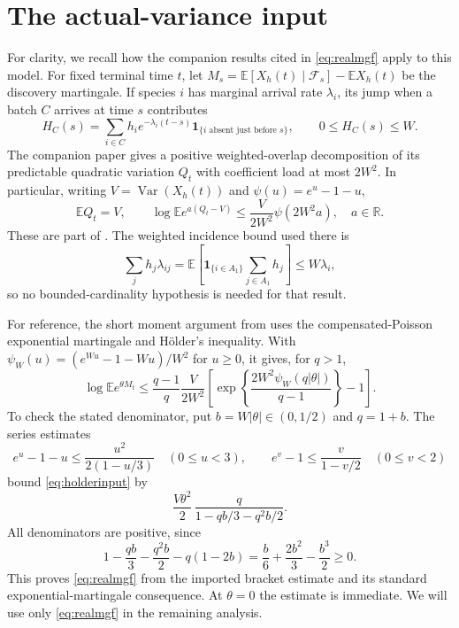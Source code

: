\documentclass[11pt]{article}
\numberwithin{equation}{section}
\theoremstyle{remark}
\newcommand{\E}{\mathbb E}
\newcommand{\R}{\mathbb R}
\newcommand{\ind}{\mathbf 1}
\newcommand{\Var}{\operatorname{Var}}
\begin{document}
\section{The actual-variance input}\label{sec:input}

For clarity, we recall how the companion results cited in
\eqref{eq:realmgf} apply to this model. For fixed terminal time $t$, let
$M_s=\E[X_h(t)\mid\mathcal F_s]-\E X_h(t)$ be the discovery martingale.
If species $i$ has marginal arrival rate $\lambda_i$, its jump when a batch
$C$ arrives at time $s$ contributes
\[
 H_C(s)=\sum_{i\in C}h_i e^{-\lambda_i(t-s)}
                    \ind_{\{i\text{ absent just before }s\}},
 \qquad 0\le H_C(s)\le W.
\]
The companion paper gives a positive weighted-overlap decomposition of its
predictable quadratic variation $Q_t$ with coefficient load at most $2W^2$.
In particular, writing $V=\Var(X_h(t))$ and $\psi(u)=e^u-1-u$,
\begin{equation}\label{eq:bracketinput}
 \E Q_t=V,\qquad
 \log\E e^{a(Q_t-V)}\le\frac{V}{2W^2}\psi(2W^2a),
 \quad a\in\R.
\end{equation}
These are part of \cite[Theorem~11.1]{LongCompanion}. The weighted
incidence bound used there is
\[
 \sum_jh_j\lambda_{ij}
 =\E\left[\ind_{\{i\in A_1\}}\sum_{j\in A_1}h_j\right]
 \le W\lambda_i,
\]
so no bounded-cardinality hypothesis is needed for that result.

For reference, the short moment argument from
\cite[Proposition~9.1]{LongCompanion} uses the compensated-Poisson
exponential martingale and H\"older's inequality. With
$\psi_W(u)=(e^{Wu}-1-Wu)/W^2$ for $u\ge0$, it gives, for $q>1$,
\begin{equation}\label{eq:holderinput}
 \log\E e^{\theta M_t}
 \le\frac{q-1}{q}\frac{V}{2W^2}
 \left[\exp\left\{\frac{2W^2\psi_W(q|\theta|)}{q-1}\right\}-1\right].
\end{equation}
To check the stated denominator, put $b=W|\theta|\in(0,1/2)$ and $q=1+b$.
The series estimates
\[
 e^u-1-u\le\frac{u^2}{2(1-u/3)}\quad(0\le u<3),
 \qquad e^v-1\le\frac{v}{1-v/2}\quad(0\le v<2)
\]
bound \eqref{eq:holderinput} by
\[
 \frac{V\theta^2}{2}\,
 \frac{q}{1-qb/3-q^2b/2}.
\]
All denominators are positive, since
\[
 1-\frac{qb}{3}-\frac{q^2b}{2}-q(1-2b)
 =\frac b6+\frac{2b^2}{3}-\frac{b^3}{2}\ge0.
\]
This proves \eqref{eq:realmgf} from the imported bracket estimate and its
standard exponential-martingale consequence. At $\theta=0$ the estimate is
immediate. We will use only \eqref{eq:realmgf} in the remaining analysis.
\end{document}
